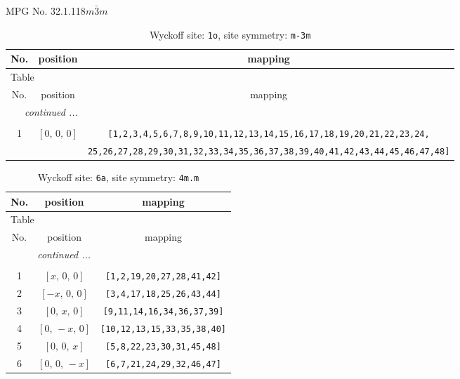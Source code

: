 \documentclass[fleqn,8pt]{jsarticle}
\begin{document}
\setcounter{MaxMatrixCols}{32}

\renewcommand{\tablename}{Table~}
\renewcommand{\figurename}{Figure~}
\begin{center}
\LARGE
MPG No. 32.1.118\quad$m\bar{3}m$
\end{center}
\renewcommand{\arraystretch}{1.2}
\begin{longtable}{ccc}
\caption{Wyckoff site: {\tt 1o}, site symmetry: {\tt m-3m}}
 \\
 \hline \hline
No. & position & mapping \\ \hline \endfirsthead

\multicolumn{2}{l}{\tablename\ \thetable{}} \\
 \hline \hline
No. & position & mapping \\ \hline \endhead

 \hline \hline
\multicolumn{2}{r}{\footnotesize\it continued ...} \\ \endfoot

 \hline \hline
\multicolumn{2}{r}{} \\ \endlastfoot

1 & $\left[ 0,\, 0,\, 0 \right]$ & {\tt [1,2,3,4,5,6,7,8,9,10,11,12,13,14,15,16,17,18,19,20,21,22,23,24,} \\ \hline
 &  & {\tt 25,26,27,28,29,30,31,32,33,34,35,36,37,38,39,40,41,42,43,44,45,46,47,48]} \\
\end{longtable}
\renewcommand{\arraystretch}{1.2}
\begin{longtable}{ccc}
\caption{Wyckoff site: {\tt 6a}, site symmetry: {\tt 4m.m}}
 \\
 \hline \hline
No. & position & mapping \\ \hline \endfirsthead

\multicolumn{2}{l}{\tablename\ \thetable{}} \\
 \hline \hline
No. & position & mapping \\ \hline \endhead

 \hline \hline
\multicolumn{2}{r}{\footnotesize\it continued ...} \\ \endfoot

 \hline \hline
\multicolumn{2}{r}{} \\ \endlastfoot

1 & $\left[ x,\, 0,\, 0 \right]$ & {\tt [1,2,19,20,27,28,41,42]} \\ \hline
2 & $\left[ - x,\, 0,\, 0 \right]$ & {\tt [3,4,17,18,25,26,43,44]} \\ \hline
3 & $\left[ 0,\, x,\, 0 \right]$ & {\tt [9,11,14,16,34,36,37,39]} \\ \hline
4 & $\left[ 0,\, - x,\, 0 \right]$ & {\tt [10,12,13,15,33,35,38,40]} \\ \hline
5 & $\left[ 0,\, 0,\, x \right]$ & {\tt [5,8,22,23,30,31,45,48]} \\ \hline
6 & $\left[ 0,\, 0,\, - x \right]$ & {\tt [6,7,21,24,29,32,46,47]} \\
\end{longtable}
\end{document}
